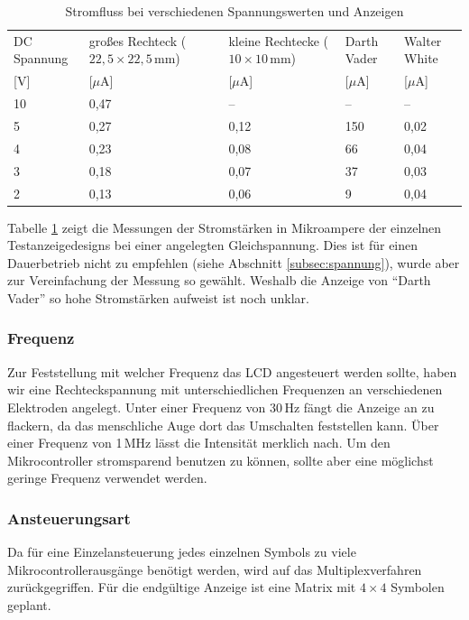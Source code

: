 \begin{table}[]
	\centering
	\caption{Stromfluss bei verschiedenen Spannungswerten und Anzeigen}
	\label{my-label}
	\begin{tabular}{p{1.2cm}|p{1.2cm}|p{1.2cm}|p{1.2cm}|p{1.2cm}}
		DC Spannung & großes Rechteck (\(22,5\times22,5\,\textrm{mm}\)) & kleine Rechtecke (\(10\times10\,\textrm{mm}\)) & Darth Vader & Walter White    \\
        {[}V{]} & {[}$\mu$A{]} & {[}$\mu$A{]} & {[}$\mu$A{]} & {[}$\mu$A{]} \\
         \hline
		10 & 0,47 & -- & --  & --   \\ \hline
		5  & 0,27 & 0,12 & 150 & 0,02 \\ \hline
		4  & 0,23 & 0,08 & 66  & 0,04 \\ \hline
		3  & 0,18 & 0,07 & 37  & 0,03 \\ \hline
		2  & 0,13 & 0,06 & 9   & 0,04 \\
	\end{tabular}
	\label{tab:volt}
\end{table}

Tabelle \ref{tab:volt} zeigt die Messungen der Stromstärken in Mikroampere der einzelnen Testanzeigedesigns bei einer angelegten Gleichspannung. Dies ist für einen Dauerbetrieb nicht zu empfehlen (siehe Abschnitt \ref{subsec:spannung}), wurde aber zur Vereinfachung der Messung so gewählt. Weshalb die Anzeige von “Darth Vader” so hohe Stromstärken aufweist ist noch unklar.

\subsubsection{Frequenz}
Zur Feststellung mit welcher Frequenz das LCD angesteuert werden sollte, haben wir eine Rechteckspannung mit unterschiedlichen Frequenzen an verschiedenen Elektroden angelegt. Unter einer Frequenz von 30\,Hz fängt die Anzeige an zu flackern, da das menschliche Auge dort das Umschalten feststellen kann. Über einer Frequenz von 1\,MHz lässt die Intensität merklich nach. Um den Mikrocontroller stromsparend benutzen zu können, sollte aber eine möglichst geringe Frequenz verwendet werden.

\subsubsection{Ansteuerungsart}
Da für eine Einzelansteuerung jedes einzelnen Symbols zu viele Mikrocontrollerausgänge benötigt werden, wird auf das Multiplexverfahren zurückgegriffen.
Für die endgültige Anzeige ist eine Matrix mit \(4\times4\) Symbolen geplant.

